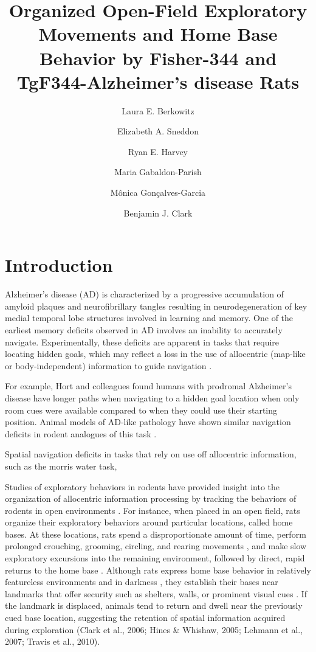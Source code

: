 \documentclass[fleqn,10pt]{wlscirep}
\title{Organized Open-Field Exploratory Movements and Home Base Behavior by Fisher-344 and TgF344-Alzheimer’s disease Rats}
\author[1]{Laura E. Berkowitz}
\author[1]{Elizabeth A. Sneddon}
\author[1]{Ryan E. Harvey}
\author[1]{Maria Gabaldon-Parish}
\author[1]{M\^{o}nica Gon\c{c}alves-Garcia}
\author[1,*]{Benjamin J. Clark}
\affil[1]{University of New Mexico, Psychology, Albuquerque, NM 87131, United States}
\affil[*]{bnjclark@unm.edu}
\begin{document}
\flushbottom
\maketitle
%
%
\thispagestyle{empty}

\section*{Introduction}

Alzheimer’s disease (AD) is characterized by a progressive accumulation of amyloid plaques and neurofibrillary tangles resulting in neurodegeneration of key medial temporal lobe structures involved in learning and memory. One of the earliest memory deficits observed in AD involves an inability to accurately navigate. Experimentally, these deficits are apparent in tasks that require locating hidden goals, which may reflect a loss in the use of allocentric (map-like or body-independent) information to guide navigation \cite{}. 

For example, Hort and colleagues\cite{hort_spatial_2007} found humans with prodromal Alzheimer's disease have longer paths when navigating to a hidden goal location when only room cues were available compared to when they could use their starting position. Animal models of AD-like pathology have shown similar navigation deficits in rodent analogues of this task \cite{janus_search_2004,}.

Spatial navigation deficits in tasks that rely on use off allocentric information, such as the morris water task,  

Studies of exploratory behaviors in rodents have provided insight into the organization of allocentric information processing by tracking the behaviors of rodents in open environments \cite{dudchenko_neuroethology_2018,poulter_neurobiology_2018,thompson_behavioral_2018}. For instance, when placed in an open field, rats organize their exploratory behaviors around particular locations, called home bases. At these locations, rats spend a disproportionate amount of time, perform prolonged crouching, grooming, circling, and rearing movements \cite{eilam_home_1989}, and make slow exploratory excursions into the remaining environment, followed by direct, rapid returns to the home base \cite{wallace_nmda_2003}. Although rats express home base behavior in relatively featureless environments and in darkness \cite{eilam_home_1989,hines_home_2005,nemati_point_2007}, they establish their bases near landmarks that offer security such as shelters, walls, or prominent visual cues \cite{clark_impaired_2005,hines_home_2005,lehmann_complete_2007,wallace_nmda_2003,whishaw_exploratory_2006}. If the landmark is displaced, animals tend to return and dwell near the previously cued base location, suggesting the retention of spatial information acquired during exploration \cite{clark_impaired_2005,hines_home_2005,lehmann_complete_2007}(Clark et al., 2006; Hines \& Whishaw, 2005; Lehmann et al., 2007; Travis et al., 2010). 
\end{document}
